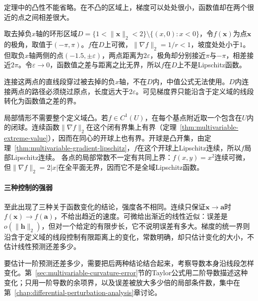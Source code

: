 定理中的凸性不能省略。在不凸的区域上，梯度可以处处很小，函数值却在两个很近的点之间相差很大。
\begin{example}[非凸区域上梯度有界而不Lipschitz]
\label{ex:multivariable-nonconvex-lipschitz-failure}
取去掉负$x$轴的环形区域$D=\{1<\lVert\bm x\rVert_2<2\}\setminus\{(x,0):x<0\}$，令$f(\bm x)$为点$\bm x$的极角，取值于$(-\pi,\pi)$。$f$在$D$上可微，$\lVert\nabla f\rVert_2=1/r<1$，坡度处处小于$1$。
但取负$x$轴两侧的点$(-1.5,\pm\varepsilon)$，两点距离为$2\varepsilon$，极角却分别接近$\pi$与$-\pi$，相差接近$2\pi$。令$\varepsilon\to0$，函数值之差与距离之比无界，所以$f$在$D$上不是Lipschitz函数。
\end{example}

连接这两点的直线段穿过被去掉的负$x$轴，不在$D$内，中值公式无法使用。$D$内连接两点的路径必须绕过原点，长度远大于$2\varepsilon$。可见梯度界只能沿含于定义域的线段转化为函数值之差的界。

局部情形不需要整个定义域凸。若$f\in C^1(U)$，在每个基点附近取一个包含在$U$内的闭球。连续函数$\lVert\nabla f\rVert_2$在这个闭有界集上有界（定理~\ref{thm:multivariable-extreme-value}），因而在同心的开球上也有界。开球是凸开集，由定理~\ref{thm:multivariable-gradient-lipschitz}，$f$在这个开球上Lipschitz连续，所以$f$局部Lipschitz连续。
各点的局部常数不一定有共同上界：$f(x,y)=x^2$连续可微，但$\lVert\nabla f\rVert_2=2|x|$在全平面无界，因而它不是全域Lipschitz函数。

\paragraph{三种控制的强弱}
至此出现了三种关于函数变化的结论，强度各不相同。连续只保证$\bm x\to\bm a$时$f(\bm x)\to f(\bm a)$，不给出趋近的速度。可微给出渐近的线性近似：误差是$o(\lVert\bm h\rVert_2)$，但对一个给定的有限步长，它不说明误差有多大。梯度的统一界则沿含于定义域的线段控制有限距离上的变化，常数明确，却只估计变化的大小，不估计线性预测还差多少。

要估计一阶预测还差多少，需要把后两种结论结合起来，考察导数本身沿线段怎样变化。第~\ref{sec:multivariable-curvature-error}节的Taylor公式用二阶导数描述这种变化；只用一阶导数的余项界，以及误差被放大多少倍的局部条件数，集中在第~\ref{chap:differential-perturbation-analysis}章讨论。
